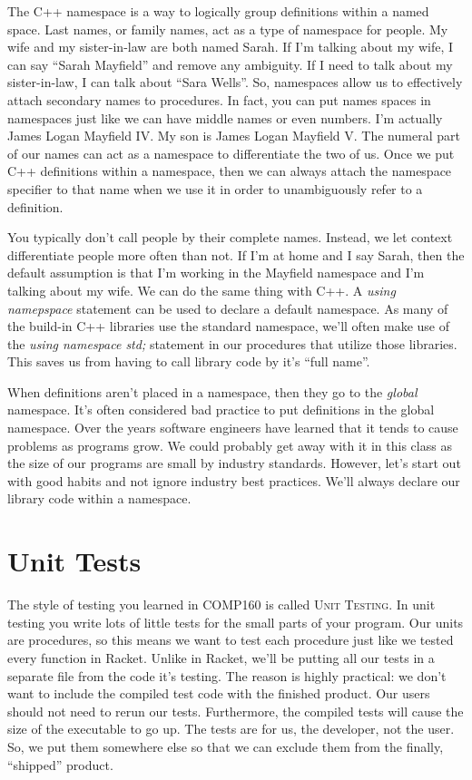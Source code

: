 \documentclass[]{tufte-handout}
\begin{document}
The C++ namespace is a way to logically group definitions within a named space. Last names, or family names, act as a type of namespace for people.  My wife and my sister-in-law are both named Sarah. If I'm talking about my wife, I can say ``Sarah Mayfield'' and remove any ambiguity. If I need to talk about my sister-in-law, I can talk about ``Sara Wells''. So, namespaces allow us to effectively attach secondary names to procedures. In fact, you can put names spaces in namespaces just like we can have middle names or even numbers. I'm actually James Logan Mayfield IV. My son is James Logan Mayfield V. The numeral part of our names can act as a namespace to differentiate the two of us. Once we put C++ definitions within a namespace, then we can always attach the namespace specifier to that name when we use it in order to unambiguously refer to a definition. 

You typically don't call people by their complete names. Instead, we let context differentiate people more often than not.  If I'm at home and I say Sarah, then the default assumption is that I'm working in the Mayfield namespace and I'm talking about my wife. We can do the same thing with C++.  A \textit{using namepspace} statement can be used to declare a default namespace. As many of the build-in C++ libraries use the standard namespace, we'll often make use of the \textit{using namespace std;} statement in our procedures that utilize those libraries.  This saves us from having to call library code by it's ``full name''.

When definitions aren't placed in a namespace, then they go to the \textit{global} namespace.  It's often considered bad practice to put definitions in the global namespace. Over the years software engineers have learned that it tends to cause problems as programs grow.  We could probably get away with it in this class as the size of our programs are small by industry standards.  However, let's start out with good habits and not ignore industry best practices. We'll always declare our library code within a namespace. 
 
\section{Unit Tests}

The style of testing you learned in COMP160 is called \textsc{Unit Testing}. In unit testing you write lots of little tests for the small parts of your program.  Our units are procedures, so this means we want to test each procedure just like we tested every function in Racket.  Unlike in Racket, we'll be putting all our tests in a separate file from the code it's testing.  The reason is highly practical: we don't want to include the compiled test code with the finished product. Our users should not need to rerun our tests. Furthermore, the compiled tests will cause the size of the executable to go up.  The tests are for us, the developer, not the user. So, we put them somewhere else so that we can exclude them from the finally, ``shipped'' product. 
\end{document}
